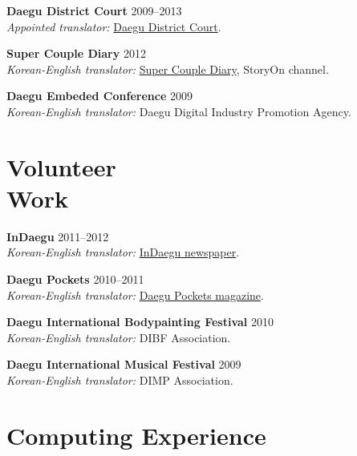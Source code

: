 \documentclass[margin,line]{resume}
\begin{document}
\begin{resume}
    \textbf{Daegu District Court} \hfill 2009--2013\\
    \textsl{Appointed translator:} \href{http://daegu.scourt.go.kr}{Daegu District Court}.

    \textbf{Super Couple Diary} \hfill 2012\\
    \textsl{Korean-English translator:}              
    \href{http://supercouple.interest.me/}{Super Couple Diary}, StoryOn channel.

     \textbf{Daegu Embeded Conference}  \hfill 2009\\
    \textsl{Korean-English translator:} Daegu Digital Industry Promotion Agency.

    
    \section{\mysidestyle Volunteer\\Work}

    \textbf{InDaegu} \hfill 2011--2012\\
    \textsl{Korean-English translator:} 
    \href{http://www.in-daegu.com/}{InDaegu newspaper}.
    
        \textbf{Daegu Pockets}  \hfill 2010--2011\\
    \textsl{Korean-English translator:}
    \href{http://daegupockets.com/}{Daegu Pockets magazine}.
    
    \textbf{Daegu International Bodypainting Festival}  \hfill 2010\\
    \textsl{Korean-English translator:} DIBF Association.
    
    \textbf{Daegu International Musical Festival}   \hfill 2009\\
    \textsl{Korean-English translator:} DIMP Association.
 


    \section{\mysidestyle Computing Experience} 


\end{resume}
\end{document}
